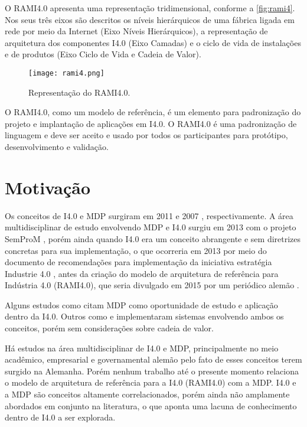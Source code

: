 O RAMI4.0 apresenta uma representação tridimensional, conforme a \autoref{fig:rami4}. Nos seus três eixos são descritos os níveis hierárquicos de uma fábrica ligada em rede por meio da Internet (Eixo Níveis Hierárquicos), a representação de arquitetura dos componentes I4.0 (Eixo Camadas) e o ciclo de vida de instalações e de produtos (Eixo Ciclo de Vida e Cadeia de Valor).

\begin{figure}[htb]
	\centering
	\texttt{[image: rami4.png]}
	\caption{Representação do RAMI4.0.}
	\label{fig:rami4}
\end{figure}

O RAMI4.0, como um modelo de referência, é um elemento para padronização do projeto e implantação de aplicações em I4.0. O RAMI4.0 é uma padronização de linguagem e deve ser aceito e usado por todos os participantes para protótipo, desenvolvimento e validação.

\section{Motivação}
\label{sec:motivacao}

Os conceitos de I4.0 e MDP surgiram em 2011 \cite{kagermann2011industrie} e 2007 \cite{wahlster2007digitalmemory}, respectivamente. A área multidisciplinar de estudo envolvendo MDP e I4.0 surgiu em 2013 com o projeto SemProM \cite{wahlster2013semprom}, porém ainda quando I4.0 era um conceito abrangente e sem diretrizes concretas para sua implementação, o que ocorreria em 2013 por meio do documento de recomendações para implementação da iniciativa estratégia Industrie 4.0 \cite{kagermann2013recommendations}, antes da criação do modelo de arquitetura de referência para Indústria 4.0 (RAMI4.0), que seria divulgado em 2015 por um periódico alemão \cite{hankel2015rami}.

Alguns estudos como  citam MDP como oportunidade de estudo e aplicação dentro da I4.0. Outros como  e  implementaram sistemas envolvendo ambos os conceitos, porém sem considerações sobre cadeia de valor.

Há estudos na área multidisciplinar de I4.0 e MDP, principalmente no meio acadêmico, empresarial e governamental alemão pelo fato de esses conceitos terem surgido na Alemanha. Porém nenhum trabalho até o presente momento relaciona o modelo de arquitetura de referência para a I4.0 (RAMI4.0) com a MDP. I4.0 e a MDP são conceitos altamente correlacionados, porém ainda não amplamente abordados em conjunto na literatura, o que aponta uma lacuna de conhecimento dentro de I4.0 a ser explorada.

